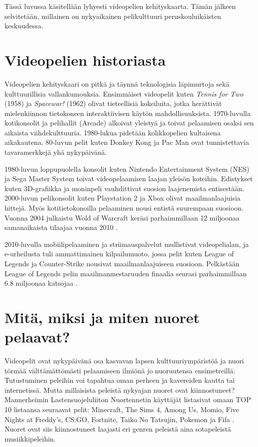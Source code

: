 \documentclass[utf8,bachelor]{gradu3}
\begin{document}
Tässä luvussa käsitellään lyhyesti videopelien kehityskaarta. Tämän jälkeen selvitetään, millainen on nykyaikainen pelikulttuuri peruskouluikäisten keskuudessa.

\section{Videopelien historiasta}

Videopelien kehityskaari on pitkä ja täynnä teknologisia läpimurtoja sekä kulttuurillisia vallankumouksia. Ensimmäiset videopelit kuten \textit{Tennis for Two} (1958) ja  \textit{Spacewar!} (1962) olivat tieteellisiä kokeiluita, jotka herättivät mielenkiinnon tietokoneen interaktiivisen käytön mahdollisuuksista. 1970-luvulla kotikonsolit ja pelihallit (Arcade) alkoivat yleistyä ja toivat pelaamisen osaksi sen aikaista viihdekulttuuria. 1980-lukua pidetään kolikkopelien kultaisena aikakautena. 80-luvun pelit kuten Donkey Kong ja Pac Man ovat tunnistettavia tavaramerkkejä yhä nykypäivänä. \parencite {stanton2015brief}

1980-luvun loppupuolella konsolit kuten Nintendo Entertainment System (NES) ja Sega Master System toivat videopelaamisen laajan yleisön koteihin. Edistykset kuten 3D-grafiikka ja moninpeli vauhdittivat suosion laajenemista entisestään. 2000-luvun pelikonsolit kuten Playstation 2 ja Xbox olivat maailmanlaajuisia hittejä. Myös kotitietokonoilla pelaaminen nousi entistä suurempaan suosioon.  Vuonna 2004 julkaistu Wold of Warcraft keräsi parhaimmillaan 12 miljoonaa samanaikaista tilaajaa vuonna 2010 \parencite{Wowlost}. \parencite {stanton2015brief}

2010-luvulla mobiilipelaaminen ja striimauspalvelut mullistivat videopelialan, ja e-urheilusta tuli ammattimainen kilpailumuoto, jossa pelit kuten League of Legends ja Counter-Strike nousivat maailmanlaajuiseen suosioon. Pelkästään League of Legends pelin maailmanmestaruuden finaalia seurasi parhaimmillaan 6.8 miljoonaa katsojaa \parencite{esportchart}.  

\section{Mitä, miksi ja miten nuoret pelaavat?}

Videopelit ovat nykypäivänä osa kasvavan lapsen kulttuuriympäristöä ja nuori törmää välttämättömästi pelaamiseen ilmiönä jo nuoruutensa ensimetreillä. Tutustuminen peleihin voi tapahtua oman perheen ja kavereiden kautta tai internetissä. Mutta millaisista peleistä nykyajan nuoret ovat kiinnostuneet? Mannerheimin Lastensuojeluliiton Nuortennetin käyttäjät listasivat omaan TOP 10 listaansa seuraavat pelit: Minecraft, The Sims 4, Among Us, Momio, Five Nights at Freddy’s, CS:GO, Fortnite, Taiko No Tatsujin, Pokemon ja Fifa \parencite{nuortennettiparas}. Nuoret ovat siis kiinnostuneet laajasti eri genren peleistä aina sotapeleistä musiikkipeleihin.  
\end{document}
